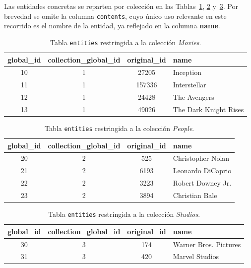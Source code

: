 \FloatBarrier

Las entidades concretas se reparten por colección en las
Tablas~\ref{tab:ejemplo_movies}, \ref{tab:ejemplo_people}
y~\ref{tab:ejemplo_studios}. Por brevedad se omite la columna
\texttt{contents}, cuyo único uso relevante en este recorrido es el
nombre de la entidad, ya reflejado en la columna \textbf{name}.

\begin{table}[h]
  \centering
  \begin{tabular}{|c|c|c|l|}
    \hline
    \textbf{global\_id} & \textbf{collection\_global\_id} & \textbf{original\_id} & \textbf{name} \\ \hline
    10 & 1 &  27205 & Inception              \\ \hline
    11 & 1 & 157336 & Interstellar           \\ \hline
    12 & 1 &  24428 & The Avengers           \\ \hline
    13 & 1 &  49026 & The Dark Knight Rises  \\ \hline
  \end{tabular}
  \caption[Tabla \texttt{entities} --- \textit{Movies}]{Tabla \texttt{entities} restringida a la colección \textit{Movies}.}
  \label{tab:ejemplo_movies}
\end{table}

\begin{table}[h]
  \centering
  \begin{tabular}{|c|c|c|l|}
    \hline
    \textbf{global\_id} & \textbf{collection\_global\_id} & \textbf{original\_id} & \textbf{name} \\ \hline
    20 & 2 &  525 & Christopher Nolan \\ \hline
    21 & 2 & 6193 & Leonardo DiCaprio \\ \hline
    22 & 2 & 3223 & Robert Downey Jr. \\ \hline
    23 & 2 & 3894 & Christian Bale    \\ \hline
  \end{tabular}
  \caption[Tabla \texttt{entities} --- \textit{People}]{Tabla \texttt{entities} restringida a la colección \textit{People}.}
  \label{tab:ejemplo_people}
\end{table}

\begin{table}[h]
  \centering
  \begin{tabular}{|c|c|c|l|}
    \hline
    \textbf{global\_id} & \textbf{collection\_global\_id} & \textbf{original\_id} & \textbf{name} \\ \hline
    30 & 3 & 174 & Warner Bros. Pictures \\ \hline
    31 & 3 & 420 & Marvel Studios        \\ \hline
  \end{tabular}
  \caption[Tabla \texttt{entities} --- \textit{Studios}]{Tabla \texttt{entities} restringida a la colección \textit{Studios}.}
  \label{tab:ejemplo_studios}
\end{table}

